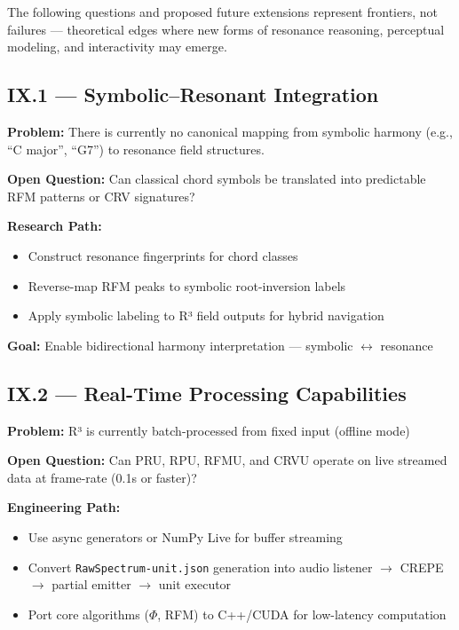 \documentclass{article}
\begin{document}
The following questions and proposed future extensions represent frontiers, not failures — theoretical edges where new forms of resonance reasoning, perceptual modeling, and interactivity may emerge.

\subsection*{IX.1 — Symbolic–Resonant Integration}

\textbf{Problem:}  
There is currently no canonical mapping from symbolic harmony (e.g., “C major”, “G7”) to resonance field structures.

\textbf{Open Question:}  
Can classical chord symbols be translated into predictable RFM patterns or CRV signatures?

\textbf{Research Path:}
\begin{itemize}
    \item Construct resonance fingerprints for chord classes
    \item Reverse-map RFM peaks to symbolic root-inversion labels
    \item Apply symbolic labeling to R³ field outputs for hybrid navigation
\end{itemize}

\textbf{Goal:}  
Enable bidirectional harmony interpretation — symbolic $\leftrightarrow$ resonance

\subsection*{IX.2 — Real-Time Processing Capabilities}

\textbf{Problem:}  
R³ is currently batch-processed from fixed input (offline mode)

\textbf{Open Question:}  
Can PRU, RPU, RFMU, and CRVU operate on live streamed data at frame-rate (0.1s or faster)?

\textbf{Engineering Path:}
\begin{itemize}
    \item Use async generators or NumPy Live for buffer streaming
    \item Convert \texttt{RawSpectrum-unit.json} generation into audio listener $\rightarrow$ CREPE $\rightarrow$ partial emitter $\rightarrow$ unit executor
    \item Port core algorithms ($\Phi$, RFM) to C++/CUDA for low-latency computation
\end{itemize}
\end{document}
